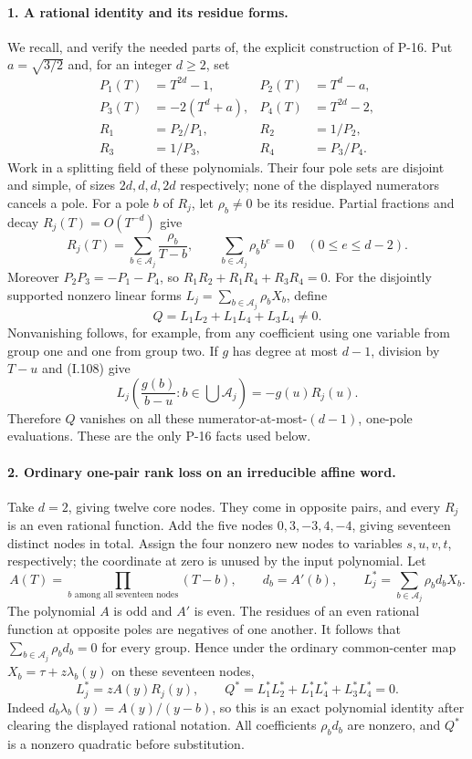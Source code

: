 \paragraph{1. A rational identity and its residue forms.}
We recall, and verify the needed parts of, the explicit construction
of P-16. Put $a=\sqrt{3/2}$ and, for an integer $d\ge2$, set
\[
 \begin{aligned}
 P_1(T)&=T^{2d}-1,&P_2(T)&=T^d-a,\\
 P_3(T)&=-2(T^d+a),&P_4(T)&=T^{2d}-2,\\
 R_1&=P_2/P_1,&R_2&=1/P_2,\\
 R_3&=1/P_3,&R_4&=P_3/P_4.
 \end{aligned}
 \tag{I.107}
\]
Work in a splitting field of these polynomials. Their four pole
sets are disjoint and simple, of sizes $2d,d,d,2d$ respectively;
none of the displayed numerators cancels a pole. For a pole
$b$ of $R_j$, let $\rho_b\ne0$ be its residue. Partial fractions
and decay $R_j(T)=O(T^{-d})$ give
\[
 R_j(T)=\sum_{b\in\mathcal A_j}\frac{\rho_b}{T-b},
 \qquad \sum_{b\in\mathcal A_j}\rho_b b^e=0
                    \quad(0\le e\le d-2).
 \tag{I.108}
\]
Moreover $P_2P_3=-P_1-P_4$, so
$R_1R_2+R_1R_4+R_3R_4=0$.
For the disjointly supported nonzero linear forms
$L_j=\sum_{b\in\mathcal A_j}\rho_b X_b$, define
\[
 Q=L_1L_2+L_1L_4+L_3L_4\ne0.
 \tag{I.109}
\]
Nonvanishing follows, for example, from any coefficient using
one variable from group one and one from group two. If $g$ has
degree at most $d-1$, division by $T-u$ and (I.108) give
\[
 L_j\left(\frac{g(b)}{b-u}:b\in\bigcup\mathcal A_j\right)
 =-g(u)R_j(u).
 \tag{I.110}
\]
Therefore $Q$ vanishes on all these numerator-at-most-$(d-1)$,
one-pole evaluations. These are the only P-16 facts used below.

\paragraph{2. Ordinary one-pair rank loss on an irreducible affine word.}
Take $d=2$, giving twelve core nodes. They come in opposite pairs,
and every $R_j$ is an even rational function. Add the five nodes
$0,3,-3,4,-4$, giving seventeen distinct nodes in total. Assign
the four nonzero new nodes to variables $s,u,v,t$, respectively;
the coordinate at zero is unused by the input polynomial.
Let
\[
 A(T)=\prod_{b\text{ among all seventeen nodes}}(T-b),
 \qquad d_b=A'(b),\qquad
 L_j^*=\sum_{b\in\mathcal A_j}\rho_b d_bX_b.
 \tag{I.111}
\]
The polynomial $A$ is odd and $A'$ is even. The residues of an
even rational function at opposite poles are negatives of one
another. It follows that $\sum_{b\in\mathcal A_j}\rho_b d_b=0$
for every group. Hence under the ordinary common-center map
$X_b=\tau+z\lambda_b(y)$ on these seventeen nodes,
\[
 L_j^*=zA(y)R_j(y),\qquad
 Q^*=L_1^*L_2^*+L_1^*L_4^*+L_3^*L_4^*=0.
 \tag{I.112}
\]
Indeed $d_b\lambda_b(y)=A(y)/(y-b)$, so this is an exact
polynomial identity after clearing the displayed rational notation.
All coefficients $\rho_bd_b$ are nonzero, and $Q^*$ is a
nonzero quadratic before substitution.


